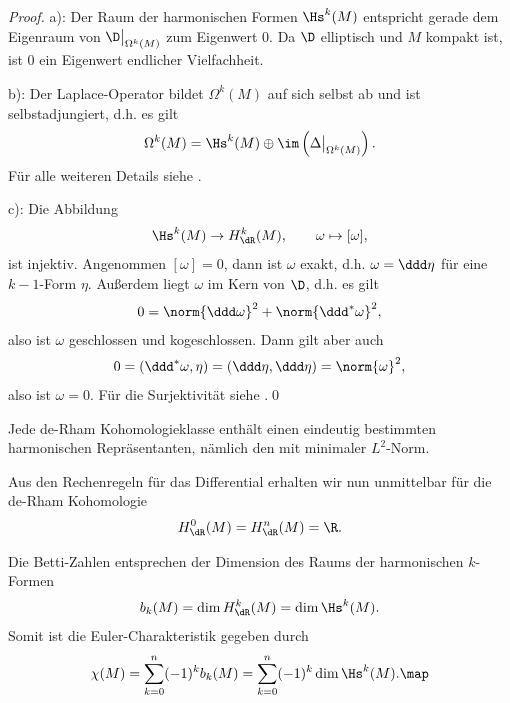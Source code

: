 \documentclass[%
	paper=a5,%
	fleqn,%
	DIV=18,%
	BCOR=0mm,
	fontsize=11pt,
	titlepage=false,%
	bibliography=totoc,
	DIV=18,%
	twoside=true,
	pdftitle=Riemannsche Geometrie,
	pdfauthor=Uwe Semmelmann,
	numbers=noendperiod]%
	{scrbook}
\begin{document}
\begin{proof}
a): Der Raum der harmonischen Formen $\Hs^k(M)$ entspricht gerade dem Eigenraum von $\D\big|_{\Omega ^k(M)}$ zum Eigenwert $0$. Da $\D$ elliptisch und $M$ kompakt ist, ist $0$ ein Eigenwert endlicher Vielfachheit.

b): Der Laplace-Operator bildet $\Omega^k(M)$ auf sich selbst ab und ist selbstadjungiert, d.h. es gilt 
\begin{align*}
\Omega^k(M) = \Hs^k(M) \oplus \im\left(\Delta\big|_{\Omega^k(M)}\right).
\end{align*}
Für alle weiteren Details siehe \cite{deRham:1984vp}.

c): Die Abbildung
\begin{align*}
\Hs^k(M) \to H_{\dR}^k(M),\qquad \omega\mapsto [\omega],
\end{align*}
ist injektiv. Angenommen $[\omega]=0$, dann ist $\omega$ exakt, d.h. $\omega = \ddd\eta$ für eine $k-1$-Form $\eta$. Außerdem liegt $\omega$ im Kern von $\D$, d.h. es gilt
\begin{align*}
0 = \norm{\ddd\omega}^2 + \norm{\ddd^*\omega}^2,
\end{align*}
also ist $\omega$ geschlossen und kogeschlossen. Dann gilt aber auch
\begin{align*}
0 = (\ddd^*\omega,\eta) = (\ddd\eta,\ddd\eta) =\norm{\omega}^2,
\end{align*}
also ist $\omega = 0$. Für die Surjektivität siehe \cite{deRham:1984vp}.\qed
\end{proof}



\begin{rem}[Bemerkungen.]
\begin{remenum}
\item Jede de-Rham Kohomologieklasse enthält einen eindeutig bestimmten harmonischen Repräsentanten, nämlich  den mit minimaler $L^2$-Norm.
\item Aus den Rechenregeln für das Differential erhalten wir nun unmittelbar für die de-Rham Kohomologie
\begin{align*}
H^0_{\dR}(M) = H^n_{\dR}(M) = \R.
\end{align*}
\item Die Betti-Zahlen entsprechen  der Dimension des Raums der harmonischen $k$-Formen
\begin{align*}
b_{k}(M) = \dim H_{\dR}^k(M) = \dim \Hs^k(M).
\end{align*}
Somit ist die Euler-Charakteristik gegeben durch
\begin{align*}
\chi(M) = \sum_{k=0}^n (-1)^k b_{k}(M) = \sum_{k=0}^n (-1)^k \dim \Hs^k(M).\map
\end{align*}
\end{remenum}
\end{rem}
\end{document}
